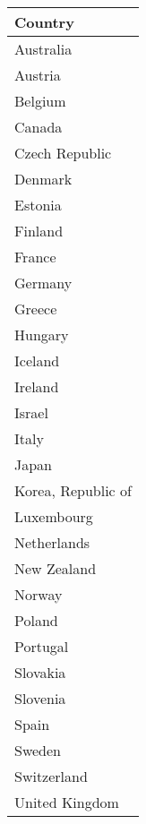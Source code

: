 \begin{table}[ht]
\centering
{\footnotesize
\begin{tabular}{l}
  \hline
Country \\ 
  \hline
Australia \\ 
  Austria \\ 
  Belgium \\ 
  Canada \\ 
  Czech Republic \\ 
  Denmark \\ 
  Estonia \\ 
  Finland \\ 
  France \\ 
  Germany \\ 
  Greece \\ 
  Hungary \\ 
  Iceland \\ 
  Ireland \\ 
  Israel \\ 
  Italy \\ 
  Japan \\ 
  Korea, Republic of \\ 
  Luxembourg \\ 
  Netherlands \\ 
  New Zealand \\ 
  Norway \\ 
  Poland \\ 
  Portugal \\ 
  Slovakia \\ 
  Slovenia \\ 
  Spain \\ 
  Sweden \\ 
  Switzerland \\ 
  United Kingdom \\ 
   \hline
\end{tabular}
}
\end{table}

